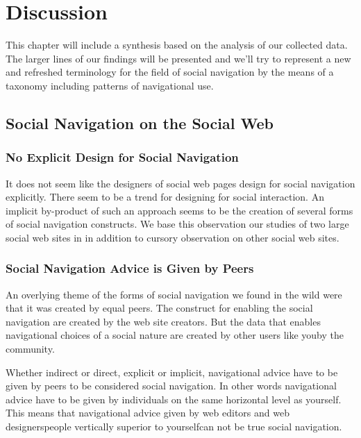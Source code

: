 \chapter{Discussion}
\label{chapter:discussion}

This chapter will include a synthesis based on the analysis of our collected
data. The larger lines of our findings will be presented and we'll try to
represent a new and refreshed terminology for the field of social navigation
by the means of a taxonomy including patterns of navigational use.

\section{Social Navigation on the Social Web}

\subsection{No Explicit Design for Social Navigation}

It does not seem like the designers of social web pages design for social
navigation explicitly. There seem to be a trend for designing for social
interaction. An implicit by-product of such an approach seems to be
the creation of several forms of social navigation constructs.
We base this observation our studies of two large social web sites in
 in addition to cursory observation on other social web
sites.

\subsection{Social Navigation Advice is Given by Peers}

An overlying theme of the forms of social navigation we found in the wild were
that it was created by equal peers. The construct for enabling the social
navigation are created by the web site creators. But the data that
enables navigational choices of a social nature are created by other users
like you\dash{}by the community.

Whether indirect or direct, explicit or implicit, navigational advice have to
be given by peers to be considered social navigation. In other words
navigational advice have to be given by individuals on the same horizontal
level as yourself. This means that navigational advice given by web editors
and web designers\dash{}people vertically superior to yourself\dash{}can not
be true social navigation.

